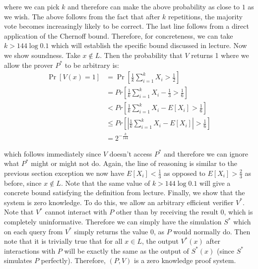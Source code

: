 \documentclass{article}
\begin{document}
\begin{enumerate}[,start=3]
where we can pick $k$ and therefore can make the above probability as close to $1$ as we wish.
The above follows from the fact that after $k$ repetitions, the majority vote becomes increasingly
likely to be correct. The last line follows from a direct application of the Chernoff bound. Therefore,
for concreteness, we can take $k > 144 \log 0.1$ which will establish the specific bound
discussed in lecture.  Now we show soundness. Take $x \notin L$. Then the probability 
that $V$ returns 1 where we allow the prover $P^*$ to be arbitrary is:%
\noindent\noindent\[%
\begin{aligned}
\Pr[V(x) = 1] &= \Pr[\frac{1}{k}\sum_{i=1}^k X_i > \frac{1}{2}] \\
&= Pr[\frac{1}{k}\sum_{i=1}^k X_i - \frac{1}{3} > \frac{1}{6}] \\
&< Pr[\frac{1}{k}\sum_{i=1}^k X_i - E[X_i] > \frac{1}{6}] \\
&\leq Pr[|\frac{1}{k}\sum_{i=1}^k X_i - E[X_i]| > \frac{1}{6}] \\
&= 2^{-\frac{k}{144}} 
\end{aligned}
\]%

which follows immediately since $V$ doesn't access $P^*$ and therefore we can ignore what $P^*$
might or might not do. Again, the line of reasoning is similar to the previous section
exception we now have $E[X_i] < \frac{1}{3}$ as opposed to $E[X_i] > \frac{2}{3}$ as before, since
$x \notin L$. Note that the same value of $k > 144\log 0.1$ will give a concrete bound
satisfying the definition from lecture.  Finally, we show that the system is zero knowledge. To do this, we allow
an arbitrary efficient verifier $V^*$. Note that $V^*$ cannot interact with $P$ other than by
receiving the result $0$, which is completely uninformative. Therefore we can simply have the
simulation $S^*$ which on each query from $V^*$ simply returns the value $0$, as $P$ would normally
do. Then note that it is trivially true that for all $x \in L$, the output $V^*(x)$ after 
interactions with $P$ will be exactly the same as the output of $S^*(x)$ (since $S^*$ simulates
$P$ perfectly). Therefore, $(P,V)$ is a zero knowledge proof system.%


\end{enumerate}
\end{document}
